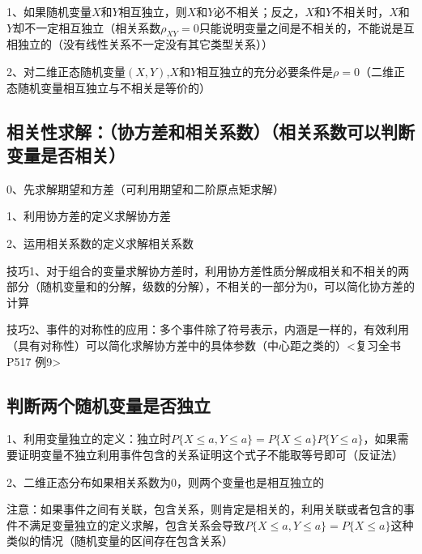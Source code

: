 1、如果随机变量$X$和$Y$相互独立，则$X$和$Y$必不相关；反之，$X$和$Y$不相关时，$X$和$Y$却不一定相互独立（相关系数$\rho_{X Y}=0$只能说明变量之间是不相关的，不能说是互相独立的（没有线性关系不一定没有其它类型关系））

2、对二维正态随机变量$(X,Y)$,$X$和$Y$相互独立的充分必要条件是$\rho=0$（二维正态随机变量相互独立与不相关是等价的）



\subsection{相关性求解：（协方差和相关系数）（相关系数可以判断变量是否相关）}

0、先求解期望和方差（可利用期望和二阶原点矩求解）

1、利用协方差的定义求解协方差

2、运用相关系数的定义求解相关系数

技巧1、对于组合的变量求解协方差时，利用协方差性质分解成相关和不相关的两部分（随机变量和的分解，级数的分解），不相关的一部分为0，可以简化协方差的计算

技巧2、事件的对称性的应用：多个事件除了符号表示，内涵是一样的，有效利用（具有对称性）可以简化求解协方差中的具体参数（中心距之类的）<复习全书P517 例9>



\subsection{判断两个随机变量是否独立}

1、利用变量独立的定义：独立时$P\{X \le a, Y \le a\} = P\{X \le a\}P\{Y \le a\}$，如果需要证明变量不独立利用事件包含的关系证明这个式子不能取等号即可（反证法）

2、二维正态分布如果相关系数为0，则两个变量也是相互独立的

注意：如果事件之间有关联，包含关系，则肯定是相关的，利用关联或者包含的事件不满足变量独立的定义求解，包含关系会导致$P\{X \le a, Y \le a\} = P\{X \le a\}$这种类似的情况（随机变量的区间存在包含关系）

